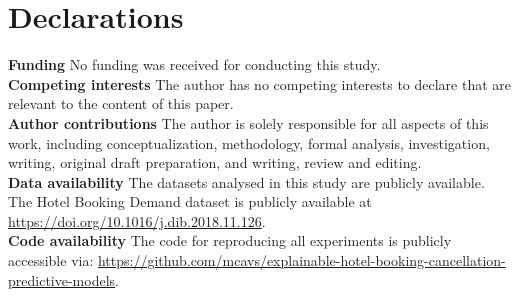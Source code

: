 \documentclass[pdflatex,iicol,sn-mathphys-ay]{sn-jnl}
\theoremstyle{thmstyleone}%
\theoremstyle{thmstyletwo}%
\theoremstyle{thmstylethree}%
\begin{document}
\backmatter

\section*{Declarations}

\textbf{Funding} No funding was received for conducting this study.\\

\noindent \textbf{Competing interests} The author has no competing interests to declare that are relevant to the content of this paper.\\

\noindent \textbf{Author contributions} The author is solely responsible for all aspects of this work, including conceptualization, methodology, formal analysis, investigation, writing, original draft preparation, and writing, review and editing.\\

\noindent \textbf{Data availability} The datasets analysed in this study are publicly available. The Hotel Booking Demand dataset is publicly available at \url{https://doi.org/10.1016/j.dib.2018.11.126}.\\

\noindent \textbf{Code availability} The code for reproducing all experiments is publicly accessible via: \url{https://github.com/mcavs/explainable-hotel-booking-cancellation-predictive-models}.


\end{document}
